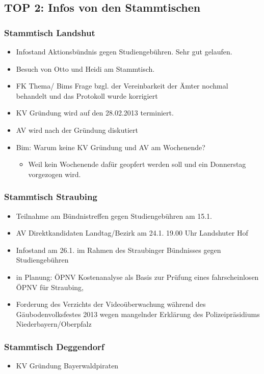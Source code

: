 \documentclass{protokoll}
\begin{document}
\subsection{TOP 2: Infos von den Stammtischen }

\subsubsection{Stammtisch Landshut}
\begin{itemize}
\item Infostand Aktionsbündnis gegen Studiengebühren. Sehr gut gelaufen.
\item Besuch von Otto und Heidi am Stammtisch.
\item FK Thema/ Bims Frage bzgl. der Vereinbarkeit der Ämter nochmal behandelt und das Protokoll wurde korrigiert
\item KV Gründung wird auf den 28.02.2013 terminiert.
\item AV wird nach der Gründung diskutiert
\item Bim: Warum keine KV Gründung und AV am Wochenende?
  \begin{itemize}
  \item Weil kein Wochenende dafür geopfert werden soll und ein Donnerstag vorgezogen wird.
  \end{itemize}
\end{itemize}

\subsubsection{Stammtisch Straubing}
\begin{itemize}
\item Teilnahme am Bündnistreffen gegen Studiengebühren am 15.1.
\item AV Direktkandidaten Landtag/Bezirk am 24.1. 19.00 Uhr Landshuter Hof
\item Infostand am 26.1. im Rahmen des Straubinger Bündnisses gegen Studiengebühren
\item in Planung: ÖPNV Kostenanalyse als Basis zur Prüfung eines fahrscheinlosen ÖPNV für Straubing, 
\item Forderung des Verzichts der Videoüberwachung während des Gäubodenvolksfestes 2013 wegen mangelnder Erklärung des Polizeipräsidiums Niederbayern/Oberpfalz
\end{itemize}

\subsubsection{Stammtisch Deggendorf}
\begin{itemize}
\item KV Gründung Bayerwaldpiraten
\end{itemize}
\end{document}
